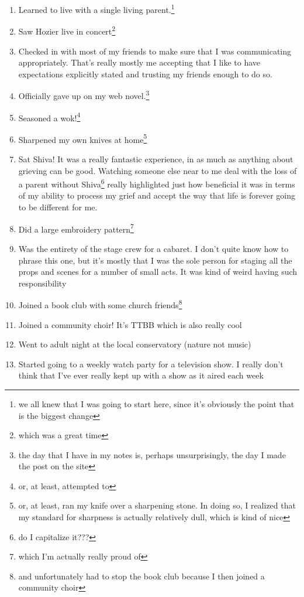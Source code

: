 \documentclass[12pt]{article}[titlepage]
\newcommand{\1}{\={a}}
\newcommand{\2}{\={e}}
\newcommand{\3}{\={\i}}
\newcommand{\4}{\=o}
\newcommand{\5}{\=u}
\newcommand{\6}{\={A}}
\renewcommand{\,}{\textsuperscript{,}}
\begin{document}
\begin{enumerate}  
\item Learned to live with a single living parent.\footnote{we all knew that I was going to start here, since it's obviously the point that is the biggest change}  
\item Saw Hozier live in concert\footnote{which was a great time}  
\item Checked in with most of my friends to make sure that I was communicating appropriately. That's really mostly me accepting that I like to have expectations explicitly stated and trusting my friends enough to do so.  
\item Officially gave up on my web novel.\footnote{the day that I have in my notes is, perhaps unsurprisingly, the day I made the post on the site}  
\item Seasoned a wok!\footnote{or, at least, attempted to}  
\item Sharpened my own knives at home\footnote{or, at least, ran my knife over a sharpening stone. In doing so, I realized that my standard for sharpness is actually relatively dull, which is kind of nice}  
\item Sat Shiva! It was a really fantastic experience, in as much as anything about grieving can be good. Watching someone else near to me deal with the loss of a parent without Shiva\footnote{do I capitalize it???} really highlighted just how beneficial it was in terms of my ability to process my grief and accept the way that life is forever going to be different for me.  
\item Did a large embroidery pattern\footnote{which I'm actually really proud of}  
\item Was the entirety of the stage crew for a cabaret. I don't quite know how to phrase this one, but it's mostly that I was the sole person for staging all the props and scenes for a number of small acts. It was kind of weird having such responsibility  
\item Joined a book club with some church friends\footnote{and unfortunately had to stop the book club because I then joined a community choir}  
\item Joined a community choir! It's TTBB which is also really cool  
\item Went to adult night at the local conservatory (nature not music)  
\item Started going to a weekly watch party for a television show. I really don't think that I've ever really kept up with a show as it aired each week  

\end{enumerate}
\end{document}

